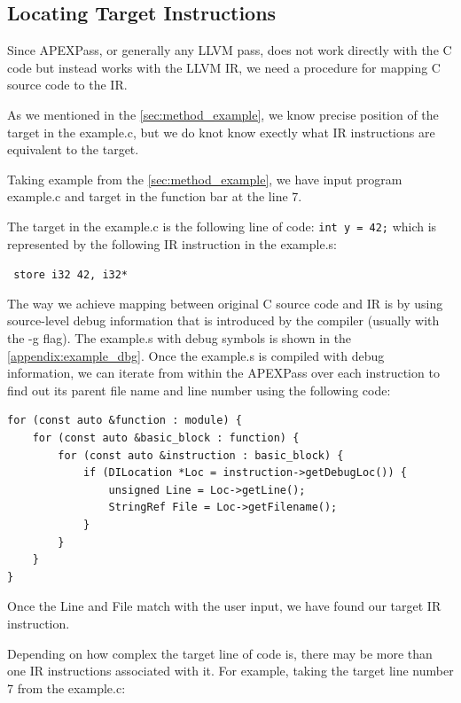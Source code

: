 \documentclass[12pt, twoside]{fithesis2}
\renewcommand{\_}{\leavevmode \kern0.07em\vbox{\hrule width0.4em}}
\begin{document}
\subsection{Locating Target Instructions}
\label{sec:impl_inst_locate}

Since APEXPass, or generally any LLVM pass, does not work directly with the C
code but instead works with the LLVM IR, we need a procedure for mapping
C source code to the IR.

As we mentioned in the \autoref{sec:method_example}, we know precise position
of the target in the example.c, but we do knot know exectly what IR
instructions are equivalent to the target.

Taking example from the \autoref{sec:method_example}, we have input program
example.c and target in the function bar at the line 7.

The target in the example.c is the following line of code:
\texttt{int y = 42;}
which is represented by the following IR instruction in the example.s:

\texttt{
store i32 42, i32* %
}

The way we achieve mapping between original C source code and IR is by
using source-level debug information that is introduced by the compiler
(usually with the -g flag).
The example.s with debug symbols is shown in the \autoref{appendix:example_dbg}.
Once the example.s is compiled with debug information, we can iterate from within
the APEXPass over each instruction to find out its parent file name and
line number using the following code:\cite{llvm-dbg}

\begin{verbatim}
for (const auto &function : module) {
    for (const auto &basic_block : function) {
        for (const auto &instruction : basic_block) {
            if (DILocation *Loc = instruction->getDebugLoc()) {
                unsigned Line = Loc->getLine();
                StringRef File = Loc->getFilename();
            }
        }
    }
}
\end{verbatim}

Once the Line and File match with the user input, we have found our target
IR instruction.

Depending on how complex the target line of code is, there may be more than one
IR instructions associated with it. For example, taking the target line number
7 from the example.c:
\end{document}
